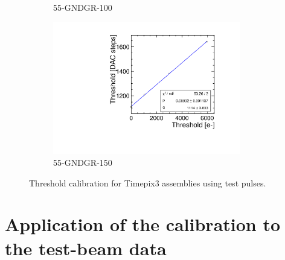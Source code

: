 \begin{figure}[htbp]
\begin{subfigure}[b]{0.45\textwidth}
    \caption{55-GNDGR-100}
  \end{subfigure} \hfill
  \begin{subfigure}[b]{0.45\textwidth}
    \includegraphics[width=0.9\textwidth]{./figures/Calibration/THLcalibration_W0005_F01.pdf}
    \caption{55-GNDGR-150}
  \end{subfigure}
  \caption{Threshold calibration for Timepix3 assemblies using test pulses.}
  \label{fig:Timepix3_THL_Calibration}
\end{figure}


\section{Application of the calibration to the test-beam data}\label{sec:appendixCalibDataG4}


